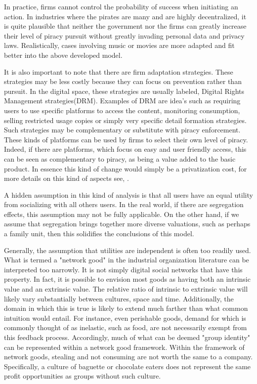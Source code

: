 \documentclass[11pt]{article}
\begin{document}
In practice, firms cannot control the probability of success when initiating an action. In industries where the pirates are many and are highly decentralized, it is quite plausible that neither the government nor the firms can greatly increase their level of piracy pursuit without greatly invading personal data and privacy laws.  Realistically, cases involving music or movies are more adapted and fit better into the above developed model. 

It is also important to note that there are firm adaptation strategies. These strategies may be less costly because they can focus on prevention rather than pursuit. In the digital space, these strategies are usually labeled, Digital Rights Management strategies(DRM). Examples of DRM are idea's such as requiring users to use specific platforms to access the content, monitoring consumption, selling restricted usage copies or simply very specific detail formation strategies. Such strategies may be complementary or substitute with piracy enforcement. These kinds of platforms can be used by firms to select their own level of piracy. Indeed, if there are platforms, which focus on easy and user friendly access, this can be seen as complementary to piracy, as being a value added to the basic product. In essence this kind of change would simply be a privatization cost, for more details on this kind of aspects see,  \citep{S04}.


A hidden assumption in this kind of analysis is that all users have an equal utility from socializing with all others users. In the real world, if there are segregation effects, this assumption may not be fully applicable. On the other hand, if we assume that segregation brings together more diverse valuations, such as perhaps a family unit, then this solidifies the conclusions of this model.

Generally, the assumption that utilities are independent is often too readily used. What is termed a "network good" in the industrial organization literature can be interpreted too narrowly. It is not simply digital social networks that have this property. In fact, it is possible to envision most goods as having both an intrinsic value and an extrinsic value. The relative ratio of intrinsic to extrinsic value will likely vary substantially between cultures, space and time. Additionally, the domain in which this is true is likely to extend much farther than what common intuition would entail. For instance, even perishable goods, demand for which is commonly thought of as inelastic, such as food, are not necessarily exempt from this feedback process. Accordingly, much of what can be deemed "group identity" can be represented within a network good framework. Within the framework of network goods, stealing and not consuming are not worth the same to a company. Specifically, a culture of baguette or chocolate eaters does not represent the same profit opportunities as groups without such culture.
\end{document}
